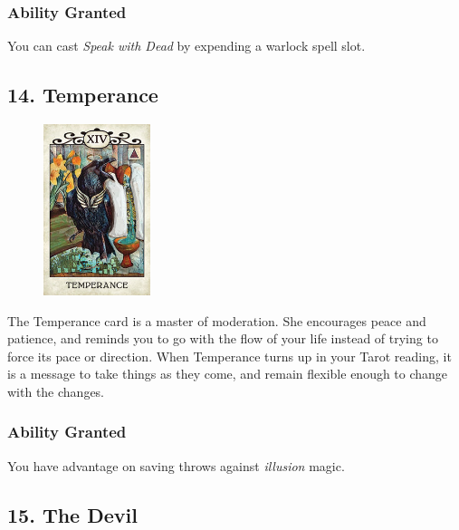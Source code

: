 \documentclass[10pt,twoside,twocolumn,openany,nodeprecatedcode]{dndbook}
\begin{document}
    \subsubsection*{Ability Granted}
    You can cast \emph{Speak with Dead} by expending a warlock spell slot.

    \subsection*{14. Temperance}

    \begin{figure}
        \includegraphics[height=5cm,width=\linewidth]{temperance.jpg}
    \end{figure}
    The Temperance card is a master of moderation. She encourages peace and patience, and reminds you to go with the flow of your life instead of trying to force its pace or direction. When Temperance turns up in your Tarot reading, it is a message to take things as they come, and remain flexible enough to change with the changes.

    \subsubsection*{Ability Granted}
    You have advantage on saving throws against \emph{illusion} magic.

    \newpage

    \subsection*{15. The Devil}
\end{document}
